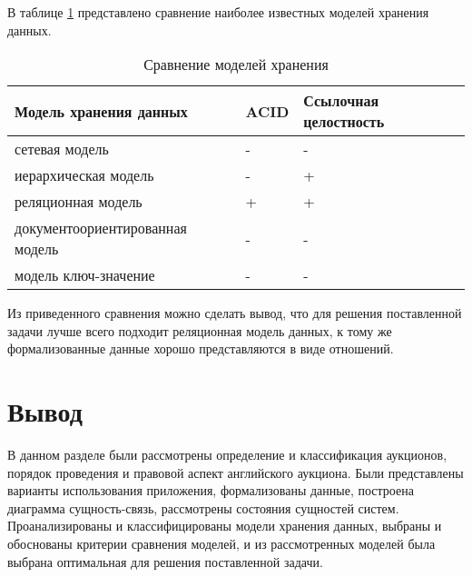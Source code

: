 В таблице \ref{tab:comparedatamodels} представлено сравнение наиболее известных моделей хранения данных.

\begin{table}[thp]
    \centering
    \caption{Сравнение моделей хранения}
    \label{tab:comparedatamodels}
    \begin{tabular}{|p{10cm}|p{1.5cm}|p{3.5cm}|}
         \hline
         \textbf{Модель хранения данных} & \textbf{ACID} & \textbf{Ссылочная \vbox{целостность}} \\
         \hline
         сетевая модель & - & - \\
         \hline
         иерархическая модель & - & + \\
         \hline
         реляционная модель & + & + \\
         \hline
         документоориентированная модель & - & - \\
         \hline
         модель ключ-значение & - & - \\
         \hline
    \end{tabular}
\end{table}

Из приведенного сравнения можно сделать вывод, что для решения поставленной задачи лучше всего подходит реляционная модель данных, к тому же формализованные данные хорошо представляются в виде отношений.

\section*{Вывод}
В данном разделе были рассмотрены определение и  классификация аукционов, порядок проведения и правовой аспект английского аукциона. Были представлены варианты использования приложения, формализованы данные, построена диаграмма сущность-связь, рассмотрены состояния сущностей систем. Проанализированы и классифицированы модели хранения данных, выбраны и обоснованы критерии сравнения моделей, и из рассмотренных моделей была выбрана оптимальная для решения поставленной задачи.
